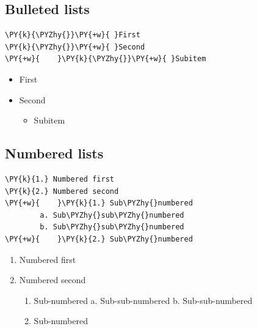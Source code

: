 \documentclass[a4paper,twoside]{article}
\begin{document}
\subsection{Bulleted lists}
\begin{tscode}[lang=md, engine=pygments]
\begin{Verbatim}[commandchars=\\\{\},breaklines, breakanywhere, commandchars=\\\{\}]
\PY{k}{\PYZhy{}}\PY{+w}{ }First
\PY{k}{\PYZhy{}}\PY{+w}{ }Second
\PY{+w}{    }\PY{k}{\PYZhy{}}\PY{+w}{ }Subitem
\end{Verbatim}
\end{tscode}
\begin{displayquote}
\begin{itemize}
\item First
\item Second
\begin{itemize}
\item Subitem
\end{itemize}
\end{itemize}
\end{displayquote}
\subsection{Numbered lists}
\begin{tscode}[lang=md, engine=pygments]
\begin{Verbatim}[commandchars=\\\{\},breaklines, breakanywhere, commandchars=\\\{\}]
\PY{k}{1.} Numbered first
\PY{k}{2.} Numbered second
\PY{+w}{    }\PY{k}{1.} Sub\PYZhy{}numbered
        a. Sub\PYZhy{}sub\PYZhy{}numbered
        b. Sub\PYZhy{}sub\PYZhy{}numbered
\PY{+w}{    }\PY{k}{2.} Sub\PYZhy{}numbered
\end{Verbatim}
\end{tscode}
\begin{displayquote}
\begin{enumerate}
\item Numbered first
\item Numbered second
\begin{enumerate}
\item Sub-numbered
a. Sub-sub-numbered
b. Sub-sub-numbered
\item Sub-numbered
\end{enumerate}
\end{enumerate}
\end{displayquote}
\end{document}
